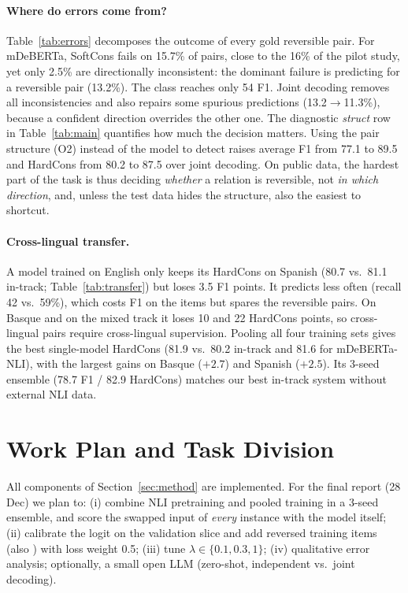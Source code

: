 \paragraph{Where do errors come from?} Table~\ref{tab:errors} decomposes the outcome of every gold reversible pair. For mDeBERTa, SoftCons fails on 15.7\% of pairs, close to the 16\% of the pilot study, yet only 2.5\% are directionally inconsistent: the dominant failure is predicting \NO for a reversible pair (13.2\%). The \NO class reaches only 54 F1. Joint decoding removes all inconsistencies and also repairs some spurious \NO predictions (13.2$\rightarrow$11.3\%), because a confident direction overrides the other one. The diagnostic \emph{struct} row in Table~\ref{tab:main} quantifies how much the \NO decision matters. Using the pair structure (O2) instead of the model to detect \NO raises average F1 from 77.1 to 89.5 and HardCons from 80.2 to 87.5 over joint decoding. On public data, the hardest part of the task is thus deciding \emph{whether} a relation is reversible, not \emph{in which direction}, and, unless the test data hides the structure, also the easiest to shortcut.



\paragraph{Cross-lingual transfer.} A model trained on English only keeps its HardCons on Spanish (80.7 vs.\ 81.1 in-track; Table~\ref{tab:transfer}) but loses 3.5 F1 points. It predicts \NO less often (recall 42 vs.\ 59\%), which costs F1 on the \NO items but spares the reversible pairs. On Basque and on the mixed track it loses 10 and 22 HardCons points, so cross-lingual pairs require cross-lingual supervision. Pooling all four training sets gives the best single-model HardCons (81.9 vs.\ 80.2 in-track and 81.6 for mDeBERTa-NLI), with the largest gains on Basque ($+2.7$) and Spanish ($+2.5$). Its 3-seed ensemble (78.7 F1 / 82.9 HardCons) matches our best in-track system without external NLI data.

\section{Work Plan and Task Division}
\label{sec:plan}

All components of Section~\ref{sec:method} are implemented. For the final report (28 Dec) we plan to:
(i) combine NLI pretraining and pooled training in a 3-seed ensemble, and score the swapped input of \emph{every} instance with the model itself;
(ii) calibrate the \NO logit on the validation slice and add reversed \NO training items (also \NO) with loss weight 0.5;
(iii) tune $\lambda\in\{0.1, 0.3, 1\}$;
(iv) qualitative error analysis; optionally, a small open LLM (zero-shot, independent vs.\ joint decoding).

